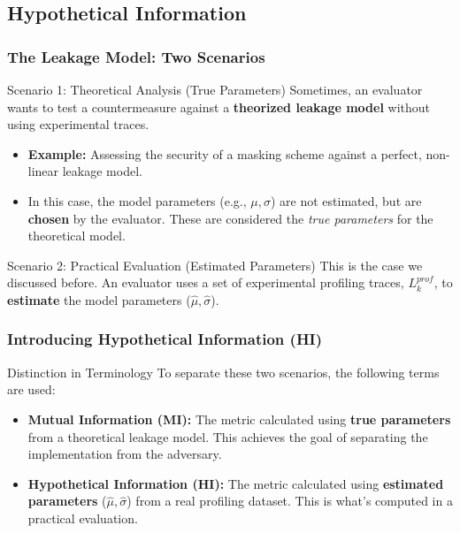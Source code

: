 \subsection{Hypothetical Information}

\begin{frame}
    \frametitle{The Leakage Model: Two Scenarios}
    
    \begin{block}{Scenario 1: Theoretical Analysis (True Parameters)}
        Sometimes, an evaluator wants to test a countermeasure against a \textbf{theorized leakage model} without using experimental traces.
        \begin{itemize}
            \item \textbf{Example:} Assessing the security of a masking scheme against a perfect, non-linear leakage model.
            \item In this case, the model parameters (e.g., $\mu, \sigma$) are not estimated, but are \textbf{chosen} by the evaluator. These are considered the \textit{true parameters} for the theoretical model.
        \end{itemize}
    \end{block}
    
    \begin{block}{Scenario 2: Practical Evaluation (Estimated Parameters)}
        This is the case we discussed before. An evaluator uses a set of experimental profiling traces, $L_k^{prof}$, to \textbf{estimate} the model parameters ($\hat{\mu}, \hat{\sigma}$).
    \end{block}
\end{frame}

\begin{frame}
    \frametitle{Introducing Hypothetical Information (HI)}
    
    \begin{block}{Distinction in Terminology}
        To separate these two scenarios, the following terms are used:
        \begin{itemize}
            \item \textbf{Mutual Information (MI):} The metric calculated using \textbf{true parameters} from a theoretical leakage model. This achieves the goal of separating the implementation from the adversary.
            
            \item \textbf{Hypothetical Information (HI):} The metric calculated using \textbf{estimated parameters} ($\hat{\mu}, \hat{\sigma}$) from a real profiling dataset. This is what's computed in a practical evaluation.
        \end{itemize}
    \end{block}
    
    
\end{frame}

